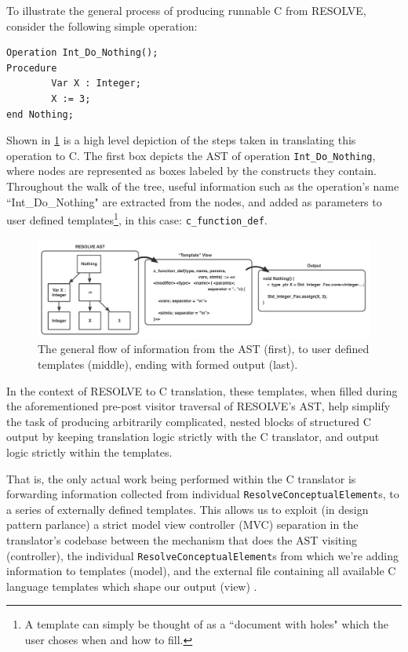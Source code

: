 \documentclass[times]{speauth}
\begin{document}
To illustrate the general process of producing runnable C from RESOLVE, consider the following simple operation:

\begin{verbatim}
Operation Int_Do_Nothing(); 
Procedure
        Var X : Integer;
        X := 3;
end Nothing;
\end{verbatim}

Shown in \ref{fig:translationflow} is a high level depiction of the steps taken in translating this operation to C. The first box depicts the AST of operation \texttt{Int\_Do\_Nothing}, where nodes are represented as boxes labeled by the constructs they contain. Throughout the walk of the tree, useful information such as the operation's name ``Int\_Do\_Nothing" are extracted from the nodes, and added as parameters to user defined templates\footnote{A template can simply be thought of as a ``document with holes" which the user choses when and how to fill.}, in this case: \texttt{c\_function\_def}.

\begin{figure}
\centering
\includegraphics[scale=.40]{figures/ast_traversal2.pdf}
\caption{The general flow of information from the AST (first), to user defined templates (middle), ending with formed output (last).}
\label{fig:translationflow}
\end{figure}

In the context of RESOLVE to C translation, these templates, when filled during the aforementioned pre-post visitor traversal of RESOLVE's AST, help simplify the task of producing arbitrarily complicated, nested blocks of structured C output by keeping translation logic strictly with the C translator, and output logic strictly within the templates.

That is, the only actual work being performed within the C translator is forwarding information collected from individual \texttt{ResolveConceptualElement}s, to a series of externally defined templates. This allows us to exploit (in design pattern parlance) a strict model view controller (MVC) separation in the translator's codebase between the mechanism that does the AST visiting (controller), the individual \texttt{ResolveConceptualElement}s from which we're adding information to templates (model), and the external file containing all available C language templates which shape our output (view) \cite{krasner:1988}.
\end{document}
